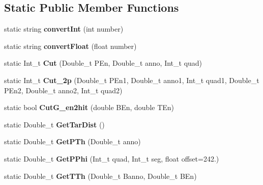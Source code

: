 \subsection*{Static Public Member Functions}
\begin{DoxyCompactItemize}
\item 
\mbox{\label{classdoppler_a100e363bf80b5371baebb89bbf60b824}} 
static string {\bfseries convert\+Int} (int number)
\item 
\mbox{\label{classdoppler_a0fa8eec8989c81e59ecfb8e09140020c}} 
static string {\bfseries convert\+Float} (float number)
\item 
\mbox{\label{classdoppler_ae9020810d4d7235eacf2b875c52172f8}} 
static Int\+\_\+t {\bfseries Cut} (Double\+\_\+t P\+En, Double\+\_\+t anno, Int\+\_\+t quad)
\item 
\mbox{\label{classdoppler_add35c6b42292a11a41d4ef055fbf231a}} 
static Int\+\_\+t {\bfseries Cut\+\_\+2p} (Double\+\_\+t P\+En1, Double\+\_\+t anno1, Int\+\_\+t quad1, Double\+\_\+t P\+En2, Double\+\_\+t anno2, Int\+\_\+t quad2)
\item 
\mbox{\label{classdoppler_a39beed8120adbda7dffdeb4e17e986c2}} 
static bool {\bfseries Cut\+G\+\_\+en2hit} (double B\+En, double T\+En)
\item 
\mbox{\label{classdoppler_a3dca88d6ac6d2c411ca26883eb10787a}} 
static Double\+\_\+t {\bfseries Get\+Tar\+Dist} ()
\item 
\mbox{\label{classdoppler_a562426907365a2c4c56fc393264394a4}} 
static Double\+\_\+t {\bfseries Get\+P\+Th} (Double\+\_\+t anno)
\item 
\mbox{\label{classdoppler_ac9cc83b2b22576320980abab50710909}} 
static Double\+\_\+t {\bfseries Get\+P\+Phi} (Int\+\_\+t quad, Int\+\_\+t seg, float offset=242.)
\item 
\mbox{\label{classdoppler_a87a75dbf49952fa574b80e6a991d0286}} 
static Double\+\_\+t {\bfseries Get\+T\+Th} (Double\+\_\+t Banno, Double\+\_\+t B\+En)
\item 
\mbox{\label{classdoppler_a42de1470ae67fefdb3ca1ea1f4d0f326}} 

\end{DoxyCompactItemize}

